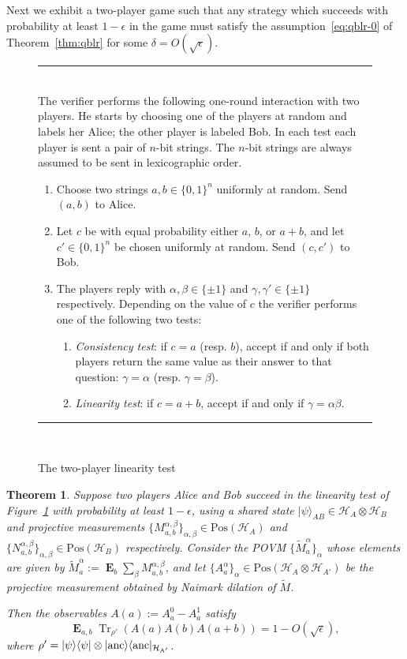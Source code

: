 \documentclass[11pt,letterpaper]{article}
\newcommand{\<}{\langle}
\renewcommand{\>}{\rangle}
\newtheorem{theorem}{Theorem}
\newcommand{\setft}[1]{\mathrm{#1}}
\renewcommand{\a}{\alpha}
\newcommand{\bra}[1]{\< #1 |}
\newcommand{\ket}[1]{| #1 \>}
\newcommand{\eps}{\epsilon}
\newcommand{\mH}{\mathcal{H}}
\DeclareMathOperator{\E}{\mathbf{E}}
\DeclareMathOperator{\Tr}{Tr}
\newcommand{\Pos}{\setft{Pos}}
\newcommand{\proj}[1]{\ket{#1}\bra{#1}}
\begin{document}
Next we exhibit a two-player game such that any strategy which succeeds with
probability at least $1 - \eps$ in the game must satisfy the assumption~\eqref{eq:qblr-0} of
Theorem~\ref{thm:qblr} for some $\delta = O(\sqrt{\eps})$.

\begin{figure}[H]
\rule[1ex]{16.5cm}{0.5pt}\\
The verifier performs the following one-round interaction with two
players. He starts by choosing one of the players at random and
labels her Alice; the other player is labeled Bob. In each test each player is sent a pair of $n$-bit strings. The $n$-bit strings are always assumed to be sent in lexicographic order.  
\begin{enumerate}
\item Choose two strings $a,b \in \{0,1\}^n$ uniformly at random. Send $(a,b)$ to Alice.
\item Let $c$ be with equal
  probability either $a$, $b$, or $a+b$, and let $c'\in\{0,1\}^n$ be chosen uniformly at random. Send $(c,c')$ to Bob.
	\item The players reply with $\alpha,\beta\in\{\pm 1\}$ and $\gamma,\gamma'\in\{\pm 1\}$ respectively. Depending on the value of $c$ the verifier performs one of the following two tests:
	\begin{enumerate}
        \item
          \emph{Consistency test}: if $c = a$ (resp. $b$), accept if and only if both players return the same value as their answer to that question: $\gamma=\alpha$ (resp. $\gamma=\beta$).
        \item
          \emph{Linearity test}: if $c = a + b$, accept if and only if $\gamma = \alpha \beta$.
        \end{enumerate}
\end{enumerate}
\rule[1ex]{16.5cm}{0.5pt}\\
\caption{The two-player linearity test}
\label{fig:linearity}
\end{figure}

\begin{theorem}
  Suppose two players Alice and Bob succeed in the linearity test of Figure~\ref{fig:linearity} with  probability at least $1 - \eps$, using a shared state $\ket{\psi}_{AB}\in\mH_A\otimes \mH_B$ and projective measurements $\{M_{a,b}^{\a, \beta}\}_{\a,\beta}\in\Pos(\mH_A)$ and $\{N_{a,
    b}^{\a, \beta}\}_{\a,\beta}\in\Pos(\mH_B)$ respectively. Consider the POVM $\{\tilde{M}_a^\alpha\}_\alpha$
  whose elements are given by $\tilde{M}_{a}^{\a} := \E_{b}
  \sum_{\beta} M_{a,b}^{\a,\beta}$, and let $\{A_a^\a\}_{\a} \in \Pos(\mH_A \otimes \mH_{A'})$ be the
  projective measurement obtained by Naimark dilation of $\tilde{M}$.
	
	Then the
  observables $A(a) := A_a^{0} - A_a^{1}$ satisfy 
	$$\E_{a,b} \Tr_{\rho'}(A(a) A(b) A(a+b)) =
  1-O(\sqrt{\eps}),$$
	where $\rho' = \proj{\psi}\otimes \proj{\rm anc}_{\mH_{A'}}$.
  \label{thm:qblr_game}
\end{theorem}
\end{document}
